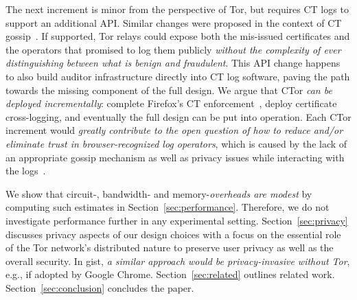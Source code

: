 The next increment is minor from the perspective of Tor, but requires CT logs to
support an additional API.  Similar changes were proposed in the context of CT
gossip~\cite{minimal-gossip}.  If supported, Tor relays could expose both the
mis-issued certificates and the operators that promised to log them publicly
\emph{without the complexity of ever distinguishing between what is benign and
fraudulent}.
This API change happens to also build auditor infrastructure
directly into CT log software, paving the path towards the missing component of
the full design.  We argue that CTor \emph{can be deployed incrementally}:
	complete Firefox's CT enforcement~\cite{ffct},
	deploy certificate cross-logging, and
	eventually the full design can be put into operation.
Each CTor increment would \emph{greatly contribute to the open question of how
to reduce and/or eliminate trust in browser-recognized log operators}, which is
caused by the lack of an appropriate gossip mechanism as well as privacy issues
while interacting with the logs~\cite{minimal-gossip,nordberg,ct-with-privacy}.

We show that circuit-, bandwidth- and memory-\emph{overheads are modest} by
computing such estimates in Section~\ref{sec:performance}.  Therefore, we do not
investigate performance further in any experimental setting.
Section~\ref{sec:privacy} discusses privacy aspects of our design choices with
a focus on the essential role of the Tor network's distributed nature to
preserve user privacy as well as the overall security.  In gist,
\emph{a similar approach would be privacy-invasive without Tor}, e.g., if
adopted by Google Chrome.  Section~\ref{sec:related} outlines related work.
Section~\ref{sec:conclusion} concludes the paper.
